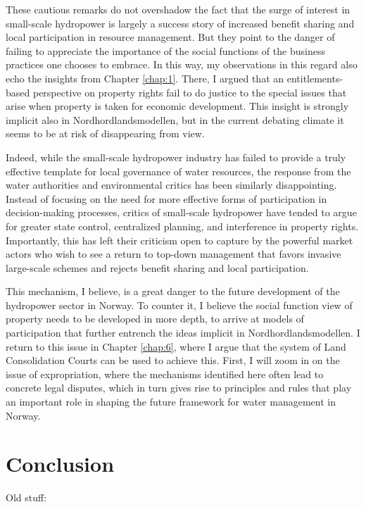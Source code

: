 These cautious remarks do not overshadow the fact that the surge of interest in small-scale hydropower is largely a success story of increased benefit sharing and local participation in resource management. But they point to the danger of failing to appreciate the importance of the social functions of the business practices one chooses to embrace. In this way, my observations in this regard also echo the insights from Chapter \ref{chap:1}. There, I argued that an entitlements-based perspective on property rights fail to do justice to the special issues that arise when property is taken for economic development. This insight is strongly implicit also in Nordhordlandsmodellen, but in the current debating climate it seems to be at risk of disappearing from view. 

Indeed, while the small-scale hydropower industry has failed to provide a truly effective template for local governance of water resources, the response from the water authorities and environmental critics has been similarly disappointing. Instead of focusing on the need for more effective forms of participation in decision-making processes, critics of small-scale hydropower have tended to argue for greater state control, centralized planning, and interference in property rights. Importantly, this has left their criticism open to capture by the powerful market actors who wish to see a return to top-down management that favors invasive large-scale schemes and rejects benefit sharing and local participation. 

This mechanism, I believe, is a great danger to the future development of the hydropower sector in Norway. To counter it, I believe the social function view of property needs to be developed in more depth, to arrive at models of participation that further entrench the ideas implicit in Nordhordlandsmodellen. I return to this issue in Chapter \ref{chap:6}, where I argue that the system of Land Consolidation Courts can be used to achieve this. First, I will zoom in on the issue of expropriation, where the mechanisms identified here often lead to concrete legal disputes, which in turn gives rise to principles and rules that play an important role in shaping the future framework for water management in Norway. 

\section{Conclusion}\label{sec:conc3}

Old stuff:

